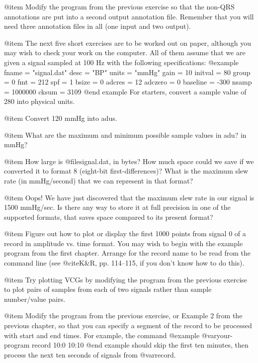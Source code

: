 {{{{{{{{@item
Modify the program from the previous exercise so that the non-QRS
annotations are put into a second output annotation file.  Remember that
you will need three annotation files in all (one input and two
output).

@item
The next five short exercises are to be worked out on paper, although you
may wish to check your work on the computer.  All of them assume that
we are given a signal sampled at 100 Hz with the following
specifications:
@example
fname = "signal.dat"
desc = "BP"
units = "mmHg"
gain = 10
initval = 80
group = 0
fmt = 212
spf = 1
bsize = 0
adcres = 12
adczero = 0
baseline = -300
nsamp = 1000000
cksum = 3109
@end example
For starters, convert a sample value of 280 into physical units.

@item
Convert 120 mmHg into adus.

@item
What are the maximum and minimum possible sample values in adu?  in
mmHg?

@item
How large is @file{signal.dat}, in bytes?  How much space could we save
if we converted it to format 8 (eight-bit first-differences)?  What is
the maximum slew rate (in mmHg/second) that we can represent in that
format?

@item
Oops!  We have just discovered that the maximum slew rate in our signal
is 1500 mmHg/sec.  Is there any way to store it at full precision in one
of the supported formats, that saves space compared to its present
format?

@item
Figure out how to plot or display the first 1000 points from signal 0 of
a record in amplitude vs. time format.  You may wish to begin with the
example program from the first chapter.  Arrange for the record name to
be read from the command line (see @cite{K&R}, pp. 114--115, if you
don't know how to do this).

@item
Try plotting VCGs by modifying the program from the previous exercise to
plot pairs of samples from each of two signals rather than sample
number/value pairs.

@item
Modify the program from the previous exercise, or Example 2 from the
previous chapter, so that you can specify a segment of the record to be
processed with start and end times.  For example, the command
@example
@var{your-program record} 10:0 10:10
@end example
should skip the first ten minutes, then process the next ten seconds of
signals from @var{record}.

}}}}}}}}

